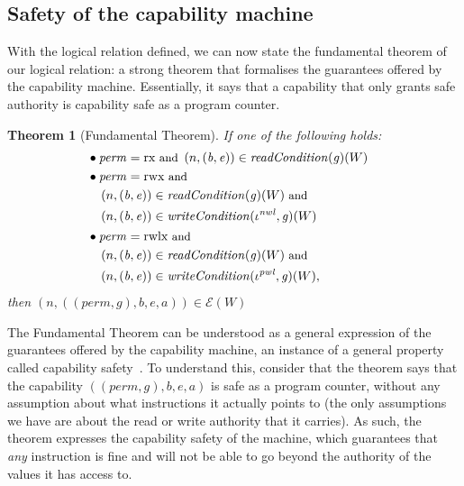 \documentclass[compsoc,conference,letterpaper,fleqn]{IEEEtran}
\newtheorem{theorem}{Theorem}
\newcommand{\var}[1]{\mathit{#1}}
\newcommand{\gl}{\var{g}}
\newcommand{\addr}{\var{a}}
\newcommand{\start}{\var{b}}
\newcommand{\addrend}{\var{e}}
\newcommand{\perm}{\var{perm}}
\newcommand{\nwl}{\var{nwl}}
\newcommand{\pwl}{\var{pwl}}
\newcommand{\plainfun}[2]{
  \ifthenelse{\equal{#2}{}}
  {\mathit{#1}}
  {\mathit{#1}(#2)}
}
\newcommand{\readCond}[1]{\plainfun{readCondition}{#1}}
\newcommand{\writeCond}[1]{\plainfun{writeCondition}{#1}}
\newcommand{\asmType}{\plaindom{AsmType}}
\newcommand{\plaindom}[1]{\mathrm{#1}}
\newcommand{\intr}[2]{\mathcal{#1}}
\newcommand{\exprintr}[1]{\intr{E}{#1}}
\newcommand{\stder}{\exprintr{\asmType}}
\newcommand{\npair}[2][n]{\left(#1,#2 \right)}
\newcommand{\plainperm}[1]{\mathrm{#1}}
\newcommand{\exec}{\plainperm{rx}}
\newcommand{\rwx}{\plainperm{rwx}}
\newcommand{\rwlx}{\plainperm{rwlx}}
\begin{document}
\subsection{Safety of the capability machine}
With the logical relation defined, we can now state the fundamental theorem of
our logical relation: a strong theorem that formalises the guarantees offered by
the capability machine. Essentially, it says that a capability that only grants
safe authority is capability safe as a program counter.
\begin{theorem}[Fundamental Theorem]
  \label{thm:ftlr}
  If one of the following holds:
  \begin{align*}
      & \bullet
        \begin{aligned}[t]
        &\perm = \exec \text{\footnotesize{ and }}\npair{(\start,\addrend)} \in \readCond{}(\gl)(W)
      \end{aligned} \\
    & \bullet 
      \begin{aligned}[t]
        &\perm = \rwx \text{\footnotesize{ and }} \\
        &\npair{(\start,\addrend)} \in \readCond{}(\gl)(W) \text{\footnotesize{ and }}\\
        &\npair{(\start,\addrend)} \in \writeCond{}(\iota^\nwl,\gl)(W)
      \end{aligned} \\
    & \bullet 
      \begin{aligned}[t]
        &\perm = \rwlx \text{\footnotesize{ and }}\\
        &\npair{(\start,\addrend)} \in \readCond{}(\gl)(W) \text{\footnotesize{ and }}\\
        &\npair{(\start,\addrend)} \in \writeCond{}(\iota^\pwl,\gl)(W),
      \end{aligned}
  \end{align*}
  then $\npair{((\perm,\gl),\start,\addrend,\addr)} \in \stder(W)$
\end{theorem}
The Fundamental Theorem can be understood as a general expression of the
guarantees offered by the capability machine, an instance of a general property
called capability safety~\citep{Devriese:2016ObjCap,Maffeis2010OC}. To
understand this, consider that the theorem says that the capability
$((\perm,\gl),\start,\addrend,\addr)$ is safe as a program counter, without any
assumption about what instructions it actually points to (the only assumptions
we have are about the read or write authority that it carries). As such, the
theorem expresses the capability safety of the machine, which guarantees that
\emph{any} instruction is fine and will not be able to go beyond the authority
of the values it has access to.
\end{document}
